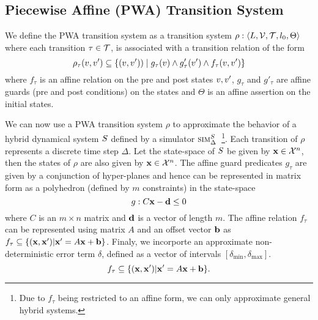 \subsection{Piecewise Affine (PWA) Transition System}

We define the PWA transition system as a transition system
$\rho:\left\langle L,\mathcal{V},\mathcal{T}, l_0,\Theta \right \rangle$
where each transition $\tau \in \mathcal{T}$, is associated with a
transition relation of the form
\[
    \rho_{\tau}(v,v') \subseteq \{(v,v')) \;|\;
    g_\tau(v) \land g'_\tau(v') \land f_{\tau}(v, v')\}
\]
where $f_{\tau}$ is an affine relation on the pre and post states
$v,v'$, $g_{\tau}$ and $g'_{\tau}$ are affine guards (pre and
post conditions) on the states and $\Theta$ is an affine assertion on
the initial states.

We can now use a PWA transition system $\rho$ to approximate the
behavior of a hybrid dynamical system $S$ defined by a simulator
$\mbox{\sc sim}_\Delta^{S}$~\footnote{Due to $f_\tau$ being restricted to an affine
form, we can only approximate general hybrid systems.}. Each
transition of $\rho$ represents a discrete time step $\Delta$. Let the
state-space of $S$ be given by $\mathbf{x}\in\mathcal{X}^n$, then the
states of $\rho$ are also given by $\mathbf{x}\in\mathcal{X}^n$. The affine guard
predicates $g_\tau$ are given by a conjunction of hyper-planes and
hence can be represented in matrix form as a polyhedron (defined by
$m$ constraints) in the state-space
\[
g:C\mathbf{x} - \mathbf{d} \le 0
\]
where $C$ is an $m \times n$ matrix and $\mathbf{d}$ is a vector of length
$m$. The affine relation $f_\tau$ can be represented using matrix $A$
and an offset vector $\mathbf{b}$ as $f_\tau \subseteq \{(\mathbf{x},\mathbf{x}') | \mathbf{x}'
= A\mathbf{x}+\mathbf{b}\}$. Finaly, we incorporte an approximate non-deterministic
error term $\delta$, defined as a vector of intervals
$[\delta_{\min},\delta_{\max}]$.
\[
    f_\tau \subseteq \{(\mathbf{x},\mathbf{x}') | \mathbf{x}' = A\mathbf{x}+\mathbf{b}\}.
\]



